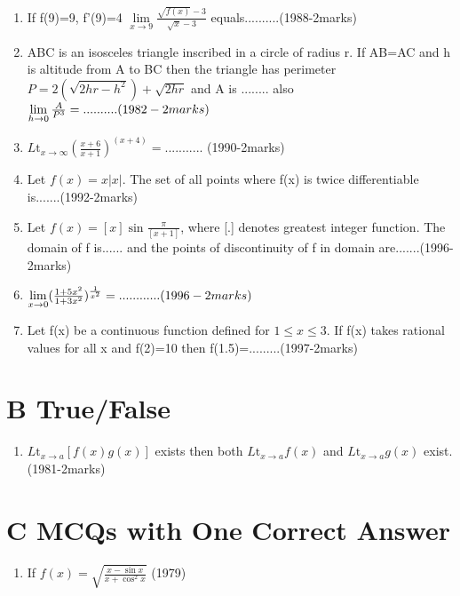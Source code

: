 \documentclass{article}
\begin{document}
\begin{multicols}{2}
\begin{enumerate}
    \item If f(9)=9, f'(9)=4 $\lim \limits_{x \to 9} \frac{\sqrt{f(x)}-3}{\sqrt{x}-3}$ equals..........\hfill (1988-2marks)\\

    \item ABC is an isosceles triangle inscribed in a circle of radius r. If AB=AC and h is altitude from A to BC then the triangle has perimeter ${P=2(\sqrt{2hr-h^2})+\sqrt{2hr}}$ and A is ........ also $\lim \limits_{h \to 0} \frac{A}{P^3}=..........\hfill (1982-2marks)$\\

    \item $L\text{t}_{x \to \infty} (\frac{x+6}{x+1})^(x+4)=...........$ \hfill (1990-2marks)\\

    \item Let $f(x)=x|x|$. The set of all points where f(x) is twice differentiable is.......\hfill (1992-2marks)\\

    \item Let $f(x)=[x] \sin\frac{\pi}{[x+1]}$, where [.] denotes greatest integer function. The domain of f is...... and the points of discontinuity of f in domain are.......\hfill (1996-2marks)\\

    \item $\lim \limits_{x \to 0} (\frac{1+5x^2}{1+3x^2})^\frac{1}{x^2}=............\hfill (1996-2marks)$\\

    \item Let f(x) be a continuous function defined for $1\leq x \leq 3$. If f(x) takes rational values for all x and f(2)=10 then f(1.5)=.........\hfill (1997-2marks)\\
\end{enumerate}
\end{multicols}

\section*{B True/False}
\begin{enumerate}
    \item $L\text{t}_{x \to a} [f(x)g(x)]$ exists then both $L\text{t}_{x \to a} f(x)$ and $L\text{t}_{x \to a} g(x)$ exist.\hfill (1981-2marks)\\
\end{enumerate}


\section*{C MCQs with One Correct Answer}
\begin{enumerate}
\item If $f(x)=\sqrt{\frac{x-\sin x}{x+\cos^2 x}}$ \hfill (1979)
\begin{enumerate}
\end{enumerate}
\end{enumerate}
\end{document}
